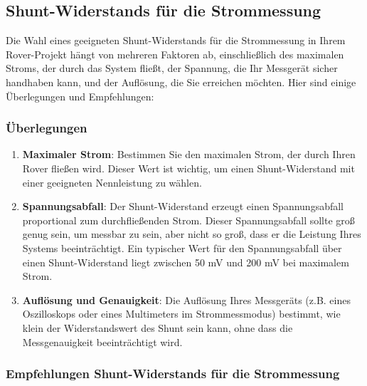 \documentclass{vorlage-design-main}
\begin{document}
\hypertarget{shunt-widerstands-fuxfcr-die-strommessung}{%
\subsection{Shunt-Widerstands für die
Strommessung}\label{shunt-widerstands-fuer-die-strommessung}}

Die Wahl eines geeigneten Shunt-Widerstands für die Strommessung in
Ihrem Rover-Projekt hängt von mehreren Faktoren ab, einschließlich des
maximalen Stroms, der durch das System fließt, der Spannung, die Ihr
Messgerät sicher handhaben kann, und der Auflösung, die Sie erreichen
möchten. Hier sind einige Überlegungen und Empfehlungen:

\hypertarget{uxfcberlegungen}{%
\subsubsection{Überlegungen}\label{ueberlegungen}}

\begin{enumerate}
\def\labelenumi{\arabic{enumi}.}
\item
  \textbf{Maximaler Strom}: Bestimmen Sie den maximalen Strom, der durch
  Ihren Rover fließen wird. Dieser Wert ist wichtig, um einen
  Shunt-Widerstand mit einer geeigneten Nennleistung zu wählen.
\item
  \textbf{Spannungsabfall}: Der Shunt-Widerstand erzeugt einen
  Spannungsabfall proportional zum durchfließenden Strom. Dieser
  Spannungsabfall sollte groß genug sein, um messbar zu sein, aber nicht
  so groß, dass er die Leistung Ihres Systems beeinträchtigt. Ein
  typischer Wert für den Spannungsabfall über einen Shunt-Widerstand
  liegt zwischen 50 mV und 200 mV bei maximalem Strom.
\item
  \textbf{Auflösung und Genauigkeit}: Die Auflösung Ihres Messgeräts
  (z.B. eines Oszilloskops oder eines Multimeters im Strommessmodus)
  bestimmt, wie klein der Widerstandswert des Shunt sein kann, ohne dass
  die Messgenauigkeit beeinträchtigt wird.
\end{enumerate}

\hypertarget{empfehlungen-shunt-widerstands-fuxfcr-die-strommessung}{%
\subsubsection{Empfehlungen Shunt-Widerstands für die
Strommessung}\label{empfehlungen-shunt-widerstands-fuer-die-strommessung}}
\end{document}
